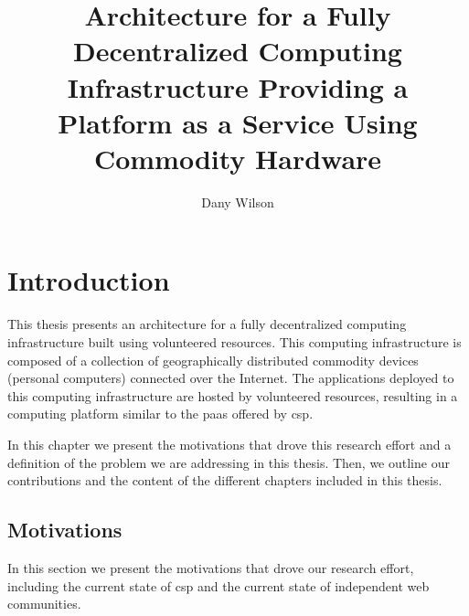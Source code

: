 \documentclass[12pt, titlepage]{uo_temp}
\title{Architecture for a Fully Decentralized Computing Infrastructure Providing a
  Platform as a Service Using Commodity Hardware}
\author{Dany Wilson}
\begin{document}


\maketitle
\makeglossaries

\tableofcontents
\clearpage

\printglossary
\clearpage


     \chapter{Introduction}
     This thesis presents an architecture for a fully decentralized computing
     infrastructure built using volunteered resources. This computing infrastructure is
     composed of a collection of geographically distributed commodity devices (personal
     computers) connected over the Internet. The applications deployed to this computing
     infrastructure are hosted by volunteered resources, resulting in a computing platform
     similar to the \gls{paas} offered by \gls{csp}.

     In this chapter we present the motivations that drove this research effort and a
     definition of the problem we are addressing in this thesis. Then, we outline our
     contributions and the content of the different chapters included in this thesis.

     \section{Motivations}
     In this section we present the motivations that drove our research effort, including
     the current state of \gls{csp} and the current state of independent web communities.
\end{document}
